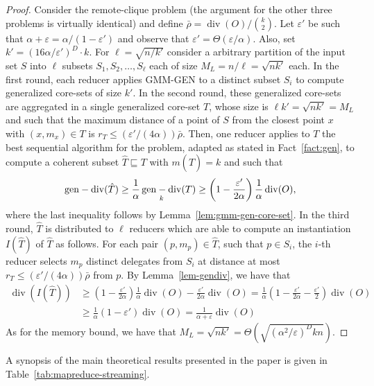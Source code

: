 \documentclass{article}
\DeclareMathOperator{\diversity}{div}
\DeclareMathOperator{\gendiv}{gen-div}
\renewcommand{\epsilon}{\varepsilon}
\newcommand{\BT}[1]{\Theta\left( #1 \right)}
\begin{document}
\begin{proof}
  Consider the remote-clique problem (the argument for the other three
  problems is virtually identical) and define
  $\bar{\rho}=\diversity(O)/{k\choose 2}$. Let $\epsilon'$ be such
  that $\alpha+\epsilon = \alpha/(1-\epsilon')$ and observe that
  $\epsilon'= \BT{\epsilon/\alpha}$. Also, set
  $k'=(16\alpha/\epsilon')^D\cdot k$.  For $\ell = \sqrt{n/k'}$
  consider a arbitrary partition of the input set $S$ into $\ell$
  subsets $S_1, S_2, \ldots, S_{\ell}$ each of size
  $M_L = n/\ell = \sqrt{nk'}$ each. In the first round, each reducer
  applies {\sc GMM-GEN} to a distinct subset $S_i$ to compute
  generalized core-sets of size $k'$. In the second round, these
  generalized core-sets are aggregated in a single generalized
  core-set $T$, whose size is $\ell k' = \sqrt{nk'} = M_L$ and such
  that the maximum distance of a point of $S$ from the closest point
  $x$ with $(x, m_x)\in T$ is
  $r_T\leq (\epsilon'/(4\alpha)) \bar{\rho}$. Then, one reducer
  applies to $T$ the best sequential algorithm for the problem,
  adapted as stated in Fact~\ref{fact:gen}, to compute a coherent
  subset $\hat{T} \sqsubseteq T$ with $m(\hat{T})= k$ and such that
\[
\gendiv(\hat{T}) \geq {1\over \alpha}\gendiv_k(T)
\geq
\left(1-\frac{\epsilon'}{2\alpha}\right){1\over \alpha}\diversity(O),
\]
where the last inequality follows by Lemma~\ref{lem:gmm-gen-core-set}.
In the third round, $\hat{T}$ is distributed to $\ell$ reducers which
are able to compute an instantiation $I(\hat{T})$ of $\hat{T}$ as
follows. For each pair $(p,m_p) \in \hat{T}$, such that $p \in S_i$,
the $i$-th reducer selects $m_p$ distinct delegates from $S_i$ at
distance at most $r_T \leq (\epsilon'/(4\alpha)) \bar{\rho}$ from
$p$. By Lemma~\ref{lem-gendiv}, we have that
\[
\begin{aligned}
\diversity(I(\hat{T})) 
&\ge 
\left(1-\frac{\epsilon'}{2\alpha}\right)\frac{1}{\alpha}\diversity(O)
- \frac{\epsilon'}{2\alpha}\diversity(O)
=
\frac{1}{\alpha}
\left(1 - \frac{\epsilon'}{2\alpha} - \frac{\epsilon'}{2}
     \right)\diversity(O) \\
     &\ge \frac{1}{\alpha}(1-\epsilon')\diversity(O)
     = \frac{1}{\alpha+\epsilon}\diversity(O)
\end{aligned}
\]
As for the memory bound, we have that
$M_L = \sqrt{n k'} = \BT{\sqrt{(\alpha^2/\epsilon)^Dkn}}$.
\end{proof}

A synopsis of the main theoretical results presented in the paper is
given in Table~\ref{tab:mapreduce-streaming}.
\end{document}
